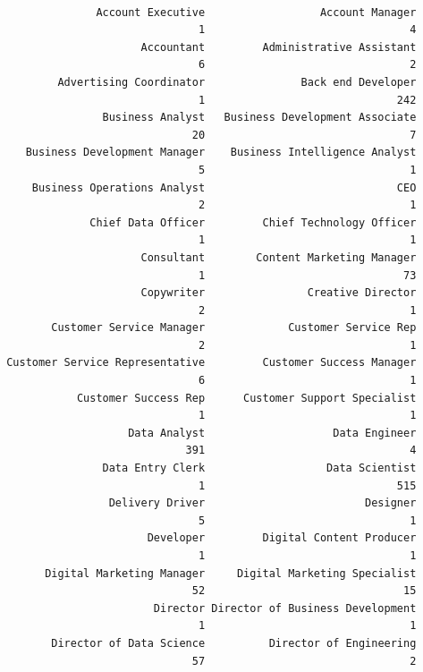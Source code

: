 \documentclass[
  letterpaper,
  DIV=11,
  numbers=noendperiod]{scrartcl}
\begin{document}
\begin{verbatim}

               Account Executive                  Account Manager 
                               1                                4 
                      Accountant         Administrative Assistant 
                               6                                2 
         Advertising Coordinator               Back end Developer 
                               1                              242 
                Business Analyst   Business Development Associate 
                              20                                7 
    Business Development Manager    Business Intelligence Analyst 
                               5                                1 
     Business Operations Analyst                              CEO 
                               2                                1 
              Chief Data Officer         Chief Technology Officer 
                               1                                1 
                      Consultant        Content Marketing Manager 
                               1                               73 
                      Copywriter                Creative Director 
                               2                                1 
        Customer Service Manager             Customer Service Rep 
                               2                                1 
 Customer Service Representative         Customer Success Manager 
                               6                                1 
            Customer Success Rep      Customer Support Specialist 
                               1                                1 
                    Data Analyst                    Data Engineer 
                             391                                4 
                Data Entry Clerk                   Data Scientist 
                               1                              515 
                 Delivery Driver                         Designer 
                               5                                1 
                       Developer         Digital Content Producer 
                               1                                1 
       Digital Marketing Manager     Digital Marketing Specialist 
                              52                               15 
                        Director Director of Business Development 
                               1                                1 
        Director of Data Science          Director of Engineering 
                              57                                2 

\end{verbatim}
\end{document}
